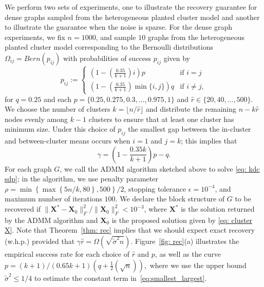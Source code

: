 \documentclass[twoside,11pt]{article}
\newcommand{\bs}{\boldsymbol}
\newcommand{\X}{\bs {X}}
\newcommand{\0}{\bs{0}}
\newcommand{\rbra}[1]{\ensuremath{\left( #1 \right)}} %
\newcommand{\bra}[1]{\ensuremath{\left\{ #1 \right\}}} %
\newcommand{\half}{\frac{1}{2}}
\begin{document}
{%
We perform two sets of experiments, one to illustrate the recovery guarantee for dense graphs sampled from the heterogeneous planted cluster model and another to illustrate the guarantee
when the noise is sparse.
For the dense graph experiments, we fix \(n = 1000\), and sample \(10\) graphs
from the heterogeneous planted cluster model corresponding to the Bernoulli
distributions \(\Omega_{ij} = Bern(p_{ij})\)  with probabilities of success $p_{ij}$ given by
\[
	p_{ij} := \begin{cases} \rbra{ 1 - \rbra{\frac{0.35}{k+1}}i } p &\text{if } i = j \\
								\rbra{ 1 - \rbra{\frac{0.35}{k+1}} \min\{i,j\} } q &\text{if } i \neq j,
							\end{cases}
\]
for $q = 0.25$ and each $p=\{0.25, 0.275, 0.3, \dots, 0.975, 1\}$ and
\(\hat r \in \{20, 40, \dots, 500\}\).
We choose the number of clusters $k=\lfloor n/\hat r \rfloor$
and distribute the remaining $n - k\hat r$ nodes
evenly among $k-1$ clusters to ensure that at least one cluster
has minimum size.
Under this choice of $p_{ij}$ the smallest gap between the in-cluster and between-cluster means occurs when $i=1$ and $j = k$; this implies that
\begin{equation}\label{eq: het gam}
	\gamma = \rbra{ 1 - \frac{0.35 k }{k+1}}p - q.
\end{equation}
For each graph \(G\), we call the ADMM algorithm sketched above to solve \eqref{eq: kdc sdp};
in the algorithm, we use penalty parameter \(\rho = \min \bra{ \max \bra{ 5n/k, 80}, 500}/2 \),
stopping tolerance \(\epsilon = 10^{-4}\), and maximum number of iterations \(100\).
We declare the block structure of \(G\) to be recovered if \(\|\X^* - \X_0\|^2_F / \|\X_0\|^2_F < 10^{-3} \),
where \(\X^* \) is the solution returned by the ADMM algorithm and \(\X_0\) is the proposed solution
given by \eqref{eq: cluster X}.
Note that Theorem~\ref{thm: rec} implies that we should expect exact recovery (w.h.p.) provided that
$
	\gamma \hat r = \Omega\rbra{\sqrt{\tilde \sigma^2n}}.
$
Figure~\ref{fig: rec}(a) illustrates the empirical success rate for each choice of \(\hat r\) and \(p\), as well as the curve \( p =(k+1)/(0.65k + 1)(q + \half\rbra{\sqrt{n}}),\) where we use the upper bound $\tilde \sigma^2 \le 1/4$ to estimate the constant term in~\eqref{eq:smallest_largest}.

}
\end{document}
